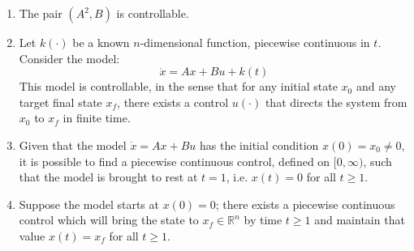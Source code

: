 \documentclass[11pt]{report}
\newcommand{\mb}{\mathbb}
\begin{document}
\begin{enumerate}[label=\alph*)]
\item The pair $(A^2,B)$ is controllable.
\item Let $k(\cdot)$ be a known $n$-dimensional function, piecewise continuous in $t$. Consider the model:
\[
\dot x = Ax + Bu + k(t)
\]
This model is controllable, in the sense that for any initial state $x_0$ and any target final state $x_f$, there exists a control $u(\cdot)$ that directs the system from $x_0$ to $x_f$ in finite time.
\item Given that the model $\dot x = Ax + Bu$ has the initial condition $x(0) = x_0 \neq 0$, it is possible to find a piecewise continuous control, defined on $[0,\infty)$, such that the model is brought to rest at $t = 1$, i.e. $x(t) = 0$ for all $t \ge 1$.
\item Suppose the model starts at $x(0) = 0$; there exists a piecewise continuous control which will bring the state to $x_f \in \mb{R}^n$ by time $t \ge 1$ and maintain that value $x(t) = x_f$ for all $t \ge 1$.
\end{enumerate}

\end{document}
